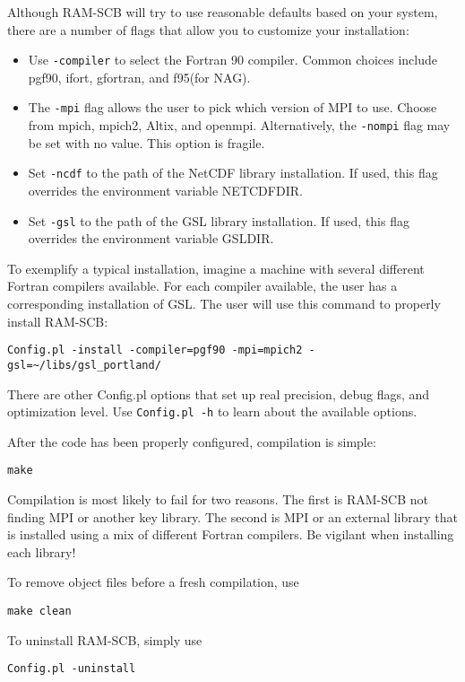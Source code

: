 Although RAM-SCB will try to use reasonable defaults based on your system, there are a number of flags that allow you to customize your installation:
\begin{itemize}
\item{Use {\tt -compiler} to select the Fortran 90 compiler. Common choices include pgf90, ifort, gfortran, and f95(for NAG).}
\item{The {\tt -mpi} flag allows the user to pick which version of MPI to use. Choose from mpich, mpich2, Altix, and openmpi. Alternatively, the {\tt -nompi} flag may be set with no value. This option is fragile.}
\item{Set {\tt -ncdf} to the path of the NetCDF library installation. If used, this flag overrides the environment variable NETCDFDIR.}
\item{Set {\tt -gsl} to the path of the GSL library installation. If used, this flag overrides the environment variable GSLDIR.}
\end{itemize}

To exemplify a typical installation, imagine a machine with several different Fortran compilers available. For each compiler available, the user has a corresponding installation of GSL. The user will use this command to properly install RAM-SCB:
\begin{verbatim}
Config.pl -install -compiler=pgf90 -mpi=mpich2 -gsl=~/libs/gsl_portland/
\end{verbatim}

There are other Config.pl options that set up real precision, debug flags, and optimization level.  Use {\tt Config.pl -h} to learn about the available options.

After the code has been properly configured, compilation is simple:
\begin{verbatim}
make
\end{verbatim}

Compilation is most likely to fail for two reasons. The first is RAM-SCB not finding MPI or another key library.  The second is MPI or an external library that is installed using a mix of different Fortran compilers. Be vigilant when installing each library!

To remove object files before a fresh compilation, use
\begin{verbatim}
make clean
\end{verbatim}

To uninstall RAM-SCB, simply use
\begin{verbatim}
Config.pl -uninstall
\end{verbatim}

